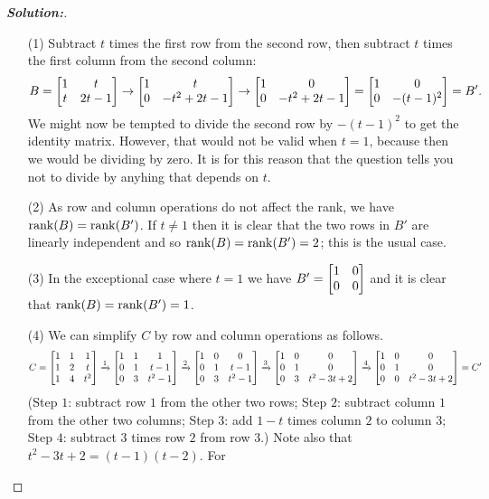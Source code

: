 \documentclass[a4paper]{amsart}
\theoremstyle{definition}
\newenvironment{solution}{\begin{proof}[\textbf{Solution:}] \vphantom{u}}{\end{proof}}
\begin{document}
\begin{solution}
 \begin{itemize}
  \item[(1)] Subtract $t$ times the first row from the second row,
   then subtract $t$ times the first column from the second column:
   \[ B =
      \left[\begin{matrix} 1&t \\ t&2t-1 \end{matrix}\right] \to 
      \left[\begin{matrix} 1&t \\ 0 & -t^2+2t-1 \end{matrix}\right] \to
      \left[\begin{matrix} 1&0 \\ 0 & -t^2+2t-1 \end{matrix}\right] = 
      \left[\begin{matrix} 1&0 \\ 0 & -(t-1)^2 \end{matrix}\right] = B'.
   \]
   We might now be tempted to divide the second row by $-(t-1)^2$ to
   get the identity matrix.  However, that would not be valid when
   $t=1$, because then we would be dividing by zero.  It is for this
   reason that the question tells you not to divide by anyhing that
   depends on $t$.
  \item[(2)] As row and column operations do not affect the rank, we
   have $\operatorname{rank}(B)=\operatorname{rank}(B')$.  If $t\neq 1$ then it is clear that the
   two rows in $B'$ are linearly independent and so
   $\operatorname{rank}(B)=\operatorname{rank}(B')=2$; this is the usual case.
  \item[(3)] In the exceptional case where $t=1$ we have
   $B'=\left[\begin{matrix} 1&0\\0&0\end{matrix}\right]$ and it is clear that $\operatorname{rank}(B)=\operatorname{rank}(B')=1$.
  \item[(4)] We can simplify $C$ by row and column operations as
   follows. 
   \[ C = 
      \left[\begin{matrix} 1 & 1 & 1 \\
           1 & 2 & t \\
           1 & 4 & t^2 \end{matrix}\right] \xrightarrow{1}
      \left[\begin{matrix} 1 & 1 & 1 \\
           0 & 1 & t-1 \\
           0 & 3 & t^2-1 \end{matrix}\right] \xrightarrow{2}
      \left[\begin{matrix} 1 & 0 & 0 \\
           0 & 1 & t-1 \\
           0 & 3 & t^2-1 \end{matrix}\right] \xrightarrow{3}
      \left[\begin{matrix} 1 & 0 & 0 \\
           0 & 1 & 0 \\
           0 & 3 & t^2-3t+2 \end{matrix}\right] \xrightarrow{4}
      \left[\begin{matrix} 1 & 0 & 0 \\
           0 & 1 & 0 \\
           0 & 0 & t^2-3t+2 \end{matrix}\right] = C'
   \]
   (Step $1$: subtract row $1$ from the other two rows; Step $2$:
   subtract column $1$ from the other two columns; Step $3$: add
   $1-t$ times column $2$ to column $3$; Step $4$: subtract $3$ times
   row $2$ from row $3$.)  Note also that $t^2-3t+2=(t-1)(t-2)$.  For

\end{itemize}
\end{solution}
\end{document}
